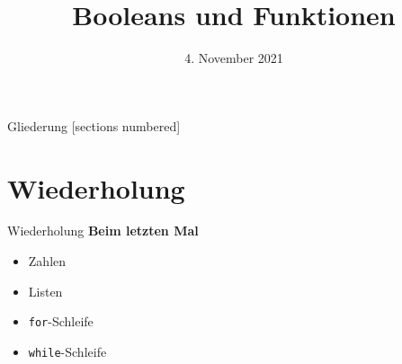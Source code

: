 



\title{Booleans und Funktionen}
\date{4. November 2021}

\usepackage{graphicx}
\usepackage{array}


	
\maketitle

\begin{frame}{Gliederung}
	[sections numbered]
	\tableofcontents
\end{frame}


\section{Wiederholung}
\begin{frame}{Wiederholung}
	\textbf{Beim letzten Mal}
	\begin{itemize}
		\item Zahlen
		\item Listen
		
		\item \alert{\texttt{for}}-Schleife
		
		\item \alert{\texttt{while}}-Schleife
		
	\end{itemize}
\end{frame}

